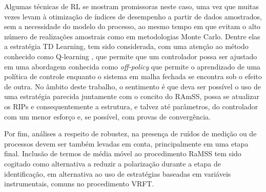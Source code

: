 Algumas técnicas de RL se mostram promissoras neste caso, uma vez que muitas vezes levam à otimização de índices de desempenho a partir de dados amostrados, sem a necessidade do modelo do processo, ao mesmo tempo em que evitam o alto número de realizações amostrais como em metodologias Monte Carlo. Dentre elas a estratégia TD Learning,
tem sido considerada, com uma atenção ao método conhecido como Q-learning \cite{watkins1992}, que permite que um controlador possa ser ajustado em uma abordagem conhecida como \textit{off-policy} que permite o aprendizado de uma política de controle enquanto o sistema em malha fechada se encontra sob o efeito de outra. No âmbito deste trabalho, o sentimento é que deva ser possível o uso de uma estratégia parecida juntamente com o concito do RAmSS, possa se atualizar os RIPs e consequentemente a estrutura, e talvez até parâmetros, do controlador com um menor esforço e, se possível, com provas de convergência.

Por fim, análises a respeito de robustez, na presença de ruídos de medição ou de processos devem ser também levadas em conta, principalmente em uma etapa final. Inclusão de termos de média móvel ao procedimento RaMSS tem sido cogitado como alternativa a reduzir a polarização durante a etapa de identificação, em alternativa ao uso de estratégias baseadas em variáveis instrumentais, comuns no procedimento VRFT.



\vspace{2cm}



